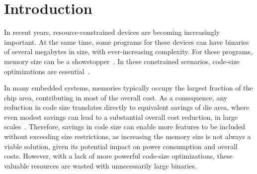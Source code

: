 \section{Introduction}
\label{sec:introduction}

In recent years, resource-constrained devices are becoming increasingly important.
At the same time, some programs for these devices can have binaries of several megabytes in size, with ever-increasing complexity.
For these programs, memory size can be a showstopper~\cite{plaza18}.
In these constrained scenarios, code-size optimizations are essential~\cite{schultz03,varma04,sehgal12,kwan12,keoh14,auler17}.

In many embedded systems, memories typically occupy the largest fraction of the chip area, contributing in most of the overall cost.
As a consequence, any reduction in code size translates directly to equivalent
savings of die area, where even modest savings can lead to a substantial overall
cost reduction, in large scales~\cite{edler10}.
Therefore, savings in code size can enable more features to be included without
exceeding size restrictions, as increasing the memory size is not always a
viable solution, given its potential impact on power consumption and overall
costs.
However, with a lack of more powerful code-size optimizations, these valuable
resources are wasted with unnecessarily large binaries.



